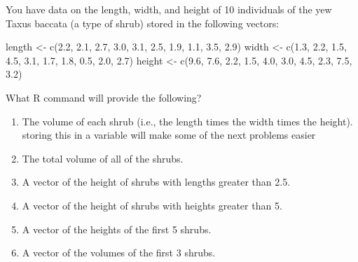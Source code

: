 \begin{q}
  You have data on the length, width, and height of 10 individuals of
  the yew Taxus baccata (a type of shrub) stored in the following vectors:

\begin{rcode}
length <- c(2.2, 2.1, 2.7, 3.0, 3.1, 2.5, 1.9, 1.1, 3.5, 2.9)
width <- c(1.3, 2.2, 1.5, 4.5, 3.1, 1.7, 1.8, 0.5, 2.0, 2.7)
height <- c(9.6, 7.6, 2.2, 1.5, 4.0, 3.0, 4.5, 2.3, 7.5, 3.2)
\end{rcode}

  What R command will provide the following?
  \begin{enumerate}
  \item The volume of each shrub (i.e., the length times the width
    times the height). storing this in a variable will make some of
    the next problems easier
  \item The total volume of all of the shrubs.
  \item A vector of the height of shrubs with lengths greater than
    2.5.
  \item A vector of the height of shrubs with heights greater than 5.
  \item A vector of the heights of the first 5 shrubs.
  \item A vector of the volumes of the first 3 shrubs.
  \end{enumerate}  
\end{q}




